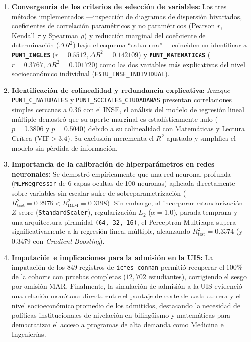 \documentclass[11pt,letterpaper]{article}
\begin{document}
\begin{enumerate}
    \item \textbf{Convergencia de los criterios de selección de variables:} Los tres métodos implementados —inspección de diagramas de dispersión bivariados, coeficientes de correlación paramétricos y no paramétricos (Pearson $r$, Kendall $\tau$ y Spearman $\rho$) y reducción marginal del coeficiente de determinación ($\Delta R^2$) bajo el esquema ``salvo una''— coinciden en identificar a \textbf{\texttt{PUNT\_INGLES}} ($r=0.5512, \Delta R^2 = 0.142109$) y \textbf{\texttt{PUNT\_MATEMATICAS}} ($r=0.3767, \Delta R^2 = 0.001720$) como las dos variables más explicativas del nivel socioeconómico individual (\texttt{ESTU\_INSE\_INDIVIDUAL}).
    \item \textbf{Identificación de colinealidad y redundancia explicativa:} Aunque \texttt{PUNT\_C\_NATURALES} y \texttt{PUNT\_SOCIALES\_CIUDADANAS} presentan correlaciones simples cercanas a $0.36$ con el INSE, el análisis del modelo de regresión lineal múltiple demostró que su aporte marginal es estadísticamente nulo ($p = 0.3806$ y $p = 0.5040$) debido a su colinealidad con Matemáticas y Lectura Crítica ($\text{VIF} > 3.4$). Su exclusión incrementa el $R^2$ ajustado y simplifica el modelo sin pérdida de información.
    \item \textbf{Importancia de la calibración de hiperparámetros en redes neuronales:} Se demostró empíricamente que una red neuronal profunda (\texttt{MLPRegressor} de 6 capas ocultas de 100 neuronas) aplicada directamente sobre variables sin escalar sufre de sobreparametrización ($R^2_{\text{test}} = 0.2976 < R^2_{\text{RLM}} = 0.3198$). Sin embargo, al incorporar estandarización $Z$-score (\texttt{StandardScaler}), regularización $L_2$ ($\alpha=1.0$), parada temprana y una arquitectura piramidal \texttt{(64, 32, 16)}, el Perceptrón Multicapa supera significativamente a la regresión lineal múltiple, alcanzando \textbf{$R^2_{\text{test}} = 0.3374$} (y \textbf{$0.3479$} con \textit{Gradient Boosting}).
    \item \textbf{Imputación e implicaciones para la admisión en la UIS:} La imputación de los $849$ registros de \texttt{icfes\_connan} permitió recuperar el $100\%$ de la cohorte con pruebas completas ($12,702$ estudiantes), corrigiendo el sesgo por omisión MAR. Finalmente, la simulación de admisión a la UIS evidenció una relación monótona directa entre el puntaje de corte de cada carrera y el nivel socioeconómico promedio de los admitidos, destacando la necesidad de políticas institucionales de nivelación en bilingüismo y matemáticas para democratizar el acceso a programas de alta demanda como Medicina e Ingenierías.
\end{enumerate}
\end{document}
